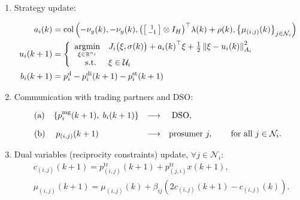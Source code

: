 \documentclass[10pt]{article}
\newcommand{\mc}{\mathcal}
\newcommand{\bb}{\mathbb}
\newcommand{\R}{\bb R}
\newcommand{\argmin}{\operatorname{argmin}}
\newcommand{\col}{\operatorname{col}}
\newcommand{\0}{\mathbf{0}}
\newcommand{\1}{\mathbf{1}}
\begin{document}
\begin{enumerate}[(1)]
\item Strategy update:

	\begin{align*} 
	\textstyle
	a_i(k) &= 
	\col \left(-\nu_y(k),-\nu_y(k),
	{\left(\left[
	\begin{smallmatrix}
	1\\
	- 1 
	\end{smallmatrix}
	\right] \otimes I_H
\right)	
	}^\top \lambda(k) + \rho(k),
	\left\{ {\mu_{(i,j)}(k)}\right\}_{j \in \mc N_i}   \right) \\	
	\textstyle
u_i(k+1) &  =
\left\{
\begin{array}{r l}
	\underset{\xi \in \R^{n_i}}{\argmin} & 
	J_{i} \big( \xi, \sigma(k) \big) 
	+ {a_i(k)}^\top \xi + \frac{1}{2}
	\left\| \xi - u_i(k) 
	\textstyle
	  \right\|^2_{A_i} \\
	\text{s.t. } & \xi \in \mc U_i
\end{array} 
	\right.
\\
b_i(k+1) & = p^{\text{d}}_i-p^{\text{di}}_i(k+1)- p^{\text{st}}_i(k+1)
	\end{align*}

\medskip
\item Communication with trading partners and DSO:

	\begin{align*}	
	\begin{array}{l l c l c}
	\text{(a)} & 
\left\{
p^{\textrm{mg}}_{i}(k+1), \; b_i(k+1)	
\right\}
	  &
	\longrightarrow & \text{ DSO,} & \\[1em]
	\text{(b)} & \; p_{(i,j)}(k+1) &
	\longrightarrow & \text{prosumer }j, & \quad \text{ for all } j \in \mc N_i. 
	\end{array}
	\end{align*}

\item Dual variables (reciprocity constraints) update, $\forall j \in \mc N_i$:
	\vspace*{-.5em}
	\begin{align*}
&	c_{(i,j)}(k+1)  =  p^{\textrm{tr}}_{(i,j)} (k+1) + p^{\textrm{tr}}_{(j,i)}x(k+1), \\
%
&	\mu_{(i,j)}(k+1) = \mu_{(i,j)}(k) + \beta_{ij} \left( 
	2  c_{(i,j)}(k+1) - c_{(i,j)}(k)
	\right).
	\end{align*}
\end{enumerate}
\end{document}
